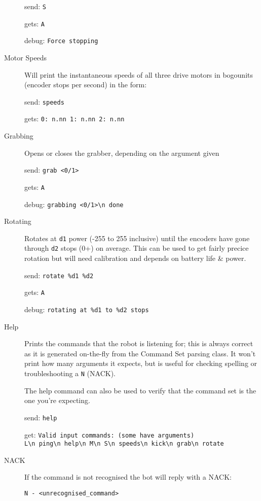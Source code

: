\begin{description}
  send: \verb|S|

  gets: \verb|A|

  debug: \verb|Force stopping|

  
\item[Motor Speeds]
  Will print the instantaneous speeds of all three drive motors in bogounits (encoder stops per second) in the form:

  send: \verb|speeds|
  
  gets: \verb|0: n.nn 1: n.nn 2: n.nn|


\item[Grabbing]
  Opens or closes the grabber, depending on the argument given

  send: \verb|grab <0/1>|

  gets: \verb|A|

  debug: \verb|grabbing <0/1>\n done|


\item[Rotating]
  Rotates at \texttt{d1} power (-255 to 255 inclusive) until the encoders have gone through \texttt{d2} stops (0+) on average. This can be used to get fairly precice rotation but will need calibration and depends on battery life \& power.

  send: \verb|rotate %d1 %d2|

  gets: \verb|A|

  debug: \verb|rotating at %d1 to %d2 stops|


\item[Help]
  Prints the commands that the robot is listening for; this is always correct as it is generated on-the-fly from the Command Set parsing class. It won't print how many arguments it expects, but is useful for checking spelling or troubleshooting a \texttt{N} (NACK).

  The help command can also be used to verify that the command set is the one you're expecting.

  send: \verb|help|

  get: \verb|Valid input commands: (some have arguments)|\\
  \verb|L\n ping\n help\n M\n S\n speeds\n kick\n grab\n rotate|


\item[NACK]
  If the command is not recognised the bot will reply with a NACK:

  \verb|N - <unrecognised_command>|

\end{description}
